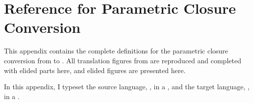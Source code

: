 \cleardoublepage
\chapter{Reference for Parametric Closure Conversion}
\label{sec:param-cc:cc:appendix}
This appendix contains the complete definitions for the parametric closure
conversion from \cpsslang to \pcctlang.
All translation figures from  are reproduced and completed
with elided parts here, and elided figures are presented here.

\begin{typographical}
  In this appendix, I typeset the source language, \pccslang, in a
  \emph{}, and the target language,
  \pcctlang, in a \emph{}.
\end{typographical}

\begingroup
\let\label\discard
\renewcommand{\cpstlang}{\pcctlang}

\FigCPSObsRel[ht]

\endgroup

\begingroup
\let\label\discard

\FigDFVs[ht]

\endgroup

\FigCCTermOne[ht]
\FigCCTermTwo[ht]
